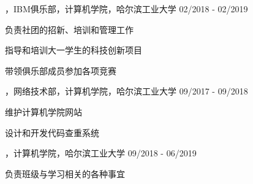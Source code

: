 
\begin{cventries}

\cvexperience
{，IBM俱乐部，计算机学院，哈尔滨工业大学}
{02/2018 - 02/2019}
{
    \begin{cvitems}
    \item {负责社团的招新、培训和管理工作}
    \item {指导和培训大一学生的科技创新项目}
    \item {带领俱乐部成员参加各项竞赛}
    \end{cvitems}
}

\cvexperience
{，网络技术部，计算机学院，哈尔滨工业大学}
{09/2017 - 09/2018}
{
    \begin{cvitems}
    \item {维护计算机学院网站}
    \item {设计和开发代码查重系统}
    \end{cvitems}
}

\cvexperience
{，计算机学院，哈尔滨工业大学}
{09/2018 - 06/2019}
{
	\begin{cvitems}
		\item {负责班级与学习相关的各种事宜}
	\end{cvitems}
}

\end{cventries}